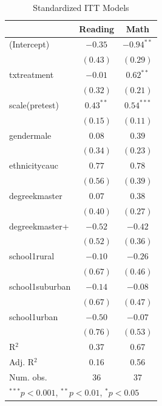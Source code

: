 \documentclass{article}\usepackage[]{graphicx}\usepackage[]{color}
\begin{document}
\begin{table}[h]
\begin{center}
\begin{tabular}{l c c }
\hline
                & Reading & Math \\
\hline
(Intercept)     & $-0.35$     & $-0.94^{**}$ \\
                & $(0.43)$    & $(0.29)$     \\
txtreatment     & $-0.01$     & $0.62^{**}$  \\
                & $(0.32)$    & $(0.21)$     \\
scale(pretest)  & $0.43^{**}$ & $0.54^{***}$ \\
                & $(0.15)$    & $(0.11)$     \\
gendermale      & $0.08$      & $0.39$       \\
                & $(0.34)$    & $(0.23)$     \\
ethnicitycauc   & $0.77$      & $0.78$       \\
                & $(0.56)$    & $(0.39)$     \\
degreekmaster   & $0.07$      & $0.38$       \\
                & $(0.40)$    & $(0.27)$     \\
degreekmaster+  & $-0.52$     & $-0.42$      \\
                & $(0.52)$    & $(0.36)$     \\
school1rural    & $-0.10$     & $-0.26$      \\
                & $(0.67)$    & $(0.46)$     \\
school1suburban & $-0.14$     & $-0.08$      \\
                & $(0.67)$    & $(0.47)$     \\
school1urban    & $-0.50$     & $-0.07$      \\
                & $(0.76)$    & $(0.53)$     \\
\hline
R$^2$           & 0.37        & 0.67         \\
Adj. R$^2$      & 0.16        & 0.56         \\
Num. obs.       & 36          & 37           \\
\hline
\multicolumn{3}{l}{\scriptsize{$^{***}p<0.001$, $^{**}p<0.01$, $^*p<0.05$}}
\end{tabular}
\caption{Standardized ITT Models}
\label{table:coefficients}
\end{center}
\end{table}
\end{document}
